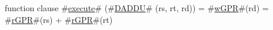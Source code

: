 function clause #\hyperref[zexecute]{execute}# (#\hyperref[zDADDU]{DADDU}# (rs, rt, rd)) =
  {
    #\hyperref[zwGPR]{wGPR}#(rd) = #\hyperref[zrGPR]{rGPR}#(rs) + #\hyperref[zrGPR]{rGPR}#(rt)
  }
